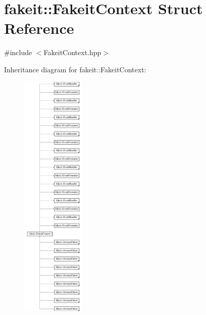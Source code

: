 \hypertarget{structfakeit_1_1FakeitContext}{}\section{fakeit\+::Fakeit\+Context Struct Reference}
\label{structfakeit_1_1FakeitContext}


{\ttfamily \#include $<$Fakeit\+Context.\+hpp$>$}

Inheritance diagram for fakeit\+::Fakeit\+Context\+:\begin{figure}[H]
\begin{center}
\leavevmode
\includegraphics[height=12.000000cm]{structfakeit_1_1FakeitContext}
\end{center}
\end{figure}
